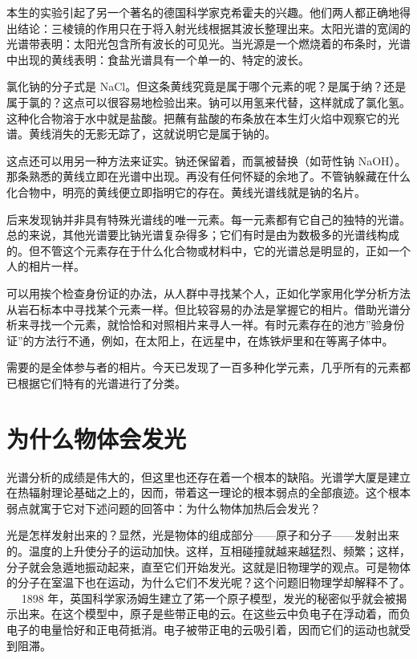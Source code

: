 本生的实验引起了另一个著名的德国科学家克希霍夫的兴趣。他们两人都正确地得出结论：三棱镜的作用只在于将入射光线根据其波长整理出来。太阳光谱的宽阔的光谱带表明：太阳光包含所有波长的可见光。当光源是一个燃烧着的布条时，光谱中出现的黄线表明：食盐光谱具有一个单一的、特定的波长。

氯化钠的分子式是 NaCl。但这条黄线究竟是属于哪个元素的呢？是属于纳？还是属于氯的？这点可以很容易地检验出来。钠可以用氢来代替，这样就成了氯化氢。这种化合物溶于水中就是盐酸。把蘸有盐酸的布条放在本生灯火焰中观察它的光谱。黄线消失的无影无踪了，这就说明它是属于钠的。

这点还可以用另一种方法来证实。钠还保留着，而氯被替换（如苛性钠 NaOH）。那条熟悉的黄线立即在光谱中出现。再没有任何怀疑的余地了。不管钠躲藏在什么化合物中，明亮的黄线便立即指明它的存在。黄线光谱线就是钠的名片。

后来发现钠并非具有特殊光谱线的唯一元素。每一元素都有它自己的独特的光谱。总的来说，其他光谱要比钠光谱复杂得多；它们有时是由为数极多的光谱线构成的。但不管这个元素存在于什么化合物或材料中，它的光谱总是明显的，正如一个人的相片一样。

可以用挨个检查身份证的办法，从人群中寻找某个人，正如化学家用化学分析方法从岩石标本中寻找某个元素一样。但比较容易的办法是掌握它的相片。借助光谱分析来寻找一个元素，就恰恰和对照相片来寻人一祥。有时元素存在的池方”验身份证”的方法行不通，例如，在太阳上，在远星中，在炼铁炉里和在等离子体中。

需要的是全体参与者的相片。今天已发现了一百多种化学元素，几乎所有的元素都已根据它们特有的光谱进行了分类。

\section{为什么物体会发光}

光谱分析的成绩是伟大的，但这里也还存在着一个根本的缺陷。光谱学大厦是建立在热辐射理论基础之上的，因而，带着这一理论的根本弱点的全部痕迹。这个根本弱点就寓于它对下述问题的回答中：为什么物体加热后会发光？

光是怎样发射出来的？显然，光是物体的组成部分——原子和分子——发射出来的。温度的上升使分子的运动加快。这样，互相碰撞就越来越猛烈、频繁；这样，分子就会急遁地振动起来，直至它们开始发光。这就是旧物理学的观点。可是物体的分子在室温下也在运动，为什么它们不发光呢？这个问题旧物理学却解释不了。
  
1898 年，英国科学家汤姆生建立了笫一个原子模型，发光的秘密似乎就会被揭示出来。在这个模型中，原子是些带正电的云。在这些云中负电子在浮动着，而负电子的电量恰好和正电荷抵消。电子被带正电的云吸引着，因而它们的运动也就受到阻滞。

